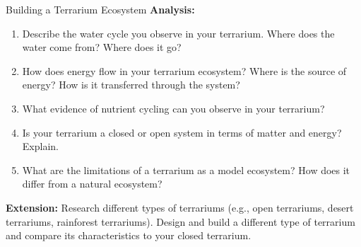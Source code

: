 \begin{investigation}{Building a Terrarium Ecosystem}
\textbf{Analysis:}
\begin{enumerate}
    \item Describe the water cycle you observe in your terrarium. Where does the water come from? Where does it go?
    \item How does energy flow in your terrarium ecosystem? Where is the source of energy? How is it transferred through the system?
    \item What evidence of nutrient cycling can you observe in your terrarium?
    \item Is your terrarium a closed or open system in terms of matter and energy? Explain.
    \item What are the limitations of a terrarium as a model ecosystem? How does it differ from a natural ecosystem?
\end{enumerate}

\textbf{Extension:} Research different types of terrariums (e.g., open terrariums, desert terrariums, rainforest terrariums).  Design and build a different type of terrarium and compare its characteristics to your closed terrarium.
\end{investigation}


